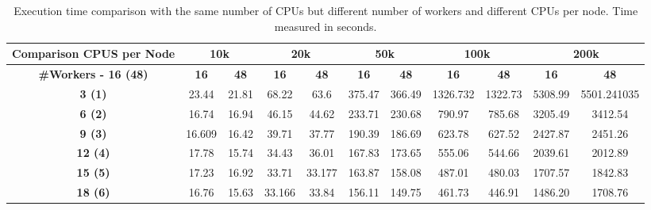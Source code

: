 \documentclass[10pt,journal,compsoc]{IEEEtran}
\let\MYoriglatexcaption\caption
\renewcommand{\caption}[2][\relax]{\MYoriglatexcaption[#2]{#2}}
\begin{document}
\begin{table}[!h]
\centering
\caption{Execution time comparison with the same number of CPUs but different number of workers and different CPUs per node. Time measured in seconds.}
\label{cpusComparison}
\begin{tabular*}{.95\textwidth}{c|cc|cc|cc|cc|cc}
\textbf{Comparison CPUS per Node} & \multicolumn{2}{c|}{\textbf{10k}} & \multicolumn{2}{c|}{\textbf{20k}} & \multicolumn{2}{c|}{\textbf{50k}} & \multicolumn{2}{c|}{\textbf{100k}} &
\multicolumn{2}{c}{\textbf{200k}}
\\ \hline
\textbf{\#Workers - 16 (48)}      & \textbf{16}     & \textbf{48}     & \textbf{16}     & \textbf{48}     & \textbf{16}     & \textbf{48}     & \textbf{16}      & \textbf{48}   & \textbf{16}     & \textbf{48}  \\ \hline
\textbf{3 (1)}                    & 23.44           & 21.81           & 68.22           & 63.6            & 375.47          & 366.49          & 1326.732         & 1322.73  & 5308.99 & 5501.241035    \\
\textbf{6 (2)}                    & 16.74           & 16.94           & 46.15           & 44.62           & 233.71          & 230.68          & 790.97           & 785.68   & 3205.49 & 3412.54       \\
\textbf{9 (3)}                    & 16.609          & 16.42           & 39.71           & 37.77           & 190.39          & 186.69          & 623.78           & 627.52   & 2427.87 & 2451.26       \\
\textbf{12 (4)}                   & 17.78           & 15.74           & 34.43           & 36.01           & 167.83          & 173.65          & 555.06           & 544.66    & 2039.61 & 2012.89      \\
\textbf{15 (5)}                   & 17.23           & 16.92           & 33.71           & 33.177          & 163.87          & 158.08          & 487.01           & 480.03     & 1707.57 & 1842.83     \\
\textbf{18 (6)}                   & 16.76           & 15.63           & 33.166          & 33.84           & 156.11          & 149.75          & 461.73           & 446.91   & 1486.20 & 1708.76      
\end{tabular*}
\end{table}
\end{document}

